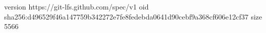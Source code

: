 version https://git-lfs.github.com/spec/v1
oid sha256:d496529f46a147759b342272e7fe8fedebda0641d90cebf9a368cf606e12cf37
size 5566

